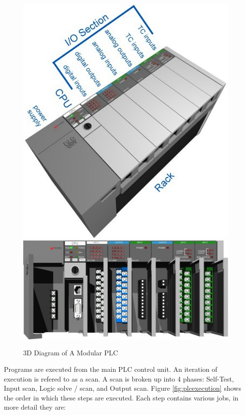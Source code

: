 \begin{figure}[htp]
    \centering
    \includegraphics[width=\imgmedphoto]{./images/c02_plcdev.jpg}
    \includegraphics[width=\imgmedphoto]{./images/c04_plcdev.jpg}
    \caption{3D Diagram of A Modular PLC \cite{img_c02_PlcDev,img_c04_PlcDev}}
    \label{img:plcrender_1}
\end{figure}

Programs are executed from the main PLC control unit. An iteration of execution is refered to as a scan. A scan is broken up into 4 phases: Self-Test, Input scan, Logic solve / scan, and Output scan. Figure \ref{fig:plcexecution} shows the order in which these steps are executed. Each step contains various jobs, in more detail they are:

